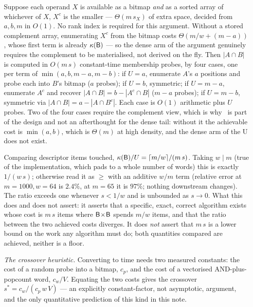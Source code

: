 Suppose each operand $X$ is available as a bitmap \emph{and} as a sorted array of whichever of $X$,
$X^c$ is the smaller --- $\Theta(m\,s_X)$ of extra space, decided from $a,b,m$ in $O(1)$. No rank
index is required for this argument. Without a stored complement array,
enumerating $X^c$ from the bitmap costs $\Theta(m/w+(m-a))$, whose first term is already $\kappa(\textsf{B})$
--- so the dense arm of the argument genuinely requires the complement to be materialised, not derived
on the fly. Then $|A\cap B|$ is computed in $O(m\,s)$ constant-time membership probes, by four cases,
one per term of $\min(a,b,m-a,m-b)$: if $U=a$, enumerate $A$'s $a$ positions and probe each into $B$'s
bitmap ($a$ probes); if $U=b$, symmetric; if $U=m-a$, enumerate $A^c$ and recover
$|A\cap B|=b-|A^c\cap B|$ ($m-a$ probes); if $U=m-b$, symmetric via $|A\cap B|=a-|A\cap B^c|$. Each
case is $O(1)$ arithmetic plus $U$ probes. Two of the four cases require the complement view, which is
why \rC\ is part of the design and not an afterthought for the dense tail: without it the achievable
cost is $\min(a,b)$, which is $\Theta(m)$ at high density, and the dense arm of the U does not exist.

Comparing descriptor items touched, $\kappa(\textsf{B})/U=\lceil m/w\rceil/(m\,s)$. Taking $w\mid m$ (true of
the implementation, which pads to a whole number of words) this is exactly $1/(w\,s)$; otherwise read
it as $\ge$ with an additive $w/m$ term (relative error at $m=1000,w=64$ is $2.4\%$, at $m=65$ it is
$97\%$; nothing downstream changes). The ratio exceeds one whenever $s<1/w$ and is unbounded as
$s\to0$. What this does and does not assert: it asserts that a specific, exact, correct
algorithm exists whose cost is $m\,s$ items where $\textsf{B}\!\times\!\textsf{B}$ spends $m/w$ items, and that the
ratio between the two achieved costs diverges. It does \emph{not} assert that $m\,s$ is a lower bound
on the work any algorithm must do; both quantities compared are achieved, neither is a floor.

\emph{The crossover heuristic.} Converting to time needs two measured constants: the cost of a random
probe into a bitmap, $c_p$, and the cost of a vectorised AND-plus-popcount word, $c_w/V$. Equating the
two costs gives the crossover $s^*=c_w/(c_p\,w\,V)$ --- an explicitly constant-factor, not asymptotic,
argument, and the only quantitative prediction of this kind in this note.

